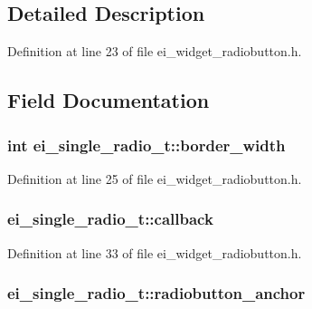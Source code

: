 \subsection{Detailed Description}


Definition at line 23 of file ei\-\_\-widget\-\_\-radiobutton.\-h.



\subsection{Field Documentation}
\hypertarget{structei__single__radio__t_a7b3fd49579613685296082126c11fb97}{
\subsubsection[{border\-\_\-width}]{\setlength{\rightskip}{0pt plus 5cm}int ei\-\_\-single\-\_\-radio\-\_\-t\-::border\-\_\-width}}\label{structei__single__radio__t_a7b3fd49579613685296082126c11fb97}


Definition at line 25 of file ei\-\_\-widget\-\_\-radiobutton.\-h.

\hypertarget{structei__single__radio__t_a5dd6b1ce68402f19b9133fd99b893dca}{
\subsubsection[{callback}]{ ei\-\_\-single\-\_\-radio\-\_\-t\-::callback}}\label{structei__single__radio__t_a5dd6b1ce68402f19b9133fd99b893dca}


Definition at line 33 of file ei\-\_\-widget\-\_\-radiobutton.\-h.

\hypertarget{structei__single__radio__t_a0e9f12f5902eea1159227041cef2a4d4}{
\subsubsection[{radiobutton\-\_\-anchor}]{ ei\-\_\-single\-\_\-radio\-\_\-t\-::radiobutton\-\_\-anchor}}\label{structei__single__radio__t_a0e9f12f5902eea1159227041cef2a4d4}


